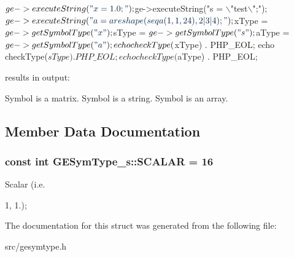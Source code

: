 \begin{DoxyCode}
$ge->executeString(\textcolor{stringliteral}{"x = 1.0;"});
$ge->executeString(\textcolor{stringliteral}{"s = \(\backslash\)"test\(\backslash\)";"});
$ge->executeString(\textcolor{stringliteral}{"a = areshape(seqa(1, 1, 24), 2|3|4);"});

$xType = $ge->getSymbolType(\textcolor{stringliteral}{"x"});
$sType = $ge->getSymbolType(\textcolor{stringliteral}{"s"});
$aType = $ge->getSymbolType(\textcolor{stringliteral}{"a"});

echo checkType($xType) . PHP\_EOL;
echo checkType($sType) . PHP\_EOL;
echo checkType($aType) . PHP\_EOL;
\end{DoxyCode}
 results in output\-: 
\begin{DoxyCode}
Symbol is a matrix.
Symbol is a \textcolor{keywordtype}{string}.
Symbol is an array.
\end{DoxyCode}
 

\subsection{Member Data Documentation}
\hypertarget{struct_g_e_sym_type__s_a4868e0d2833270b164c4a78b497f4fdc}{
\subsubsection[{S\-C\-A\-L\-A\-R}]{\setlength{\rightskip}{0pt plus 5cm}const int G\-E\-Sym\-Type\-\_\-s\-::\-S\-C\-A\-L\-A\-R = 16\hspace{0.3cm}{\ttfamily [static]}}}\label{struct_g_e_sym_type__s_a4868e0d2833270b164c4a78b497f4fdc}


Scalar (i.\-e. 

1, 1.); 

The documentation for this struct was generated from the following file\-:\begin{DoxyCompactItemize}
\item 
src/gesymtype.\-h\end{DoxyCompactItemize}
